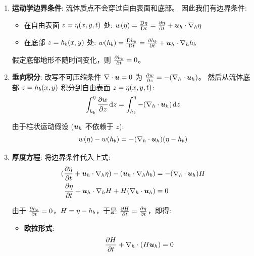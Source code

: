 \begin{enumerate}
    \item \textbf{运动学边界条件}:
    流体质点不会穿过自由表面和底部。
    因此我们有边界条件:
    \begin{itemize}
        \item 在自由表面 $z = \eta(x, y, t)$ 处: $w(\freeheight) = \matderiv{\freeheight} = \pde{\freeheight}{\timevar} + \vel_h \cdot \nabla_h \freeheight$
        \item 在底部 $z = h_b(x, y)$ 处: $w(\bottomheight) = \matderiv{\bottomheight} = \pde{\bottomheight}{\timevar} + \vel_h \cdot \nabla_h \bottomheight$
    \end{itemize}

    假定底部地形不随时间变化，则 $\pde{\bottomheight}{\timevar} = 0$。

    \item \textbf{垂向积分}:
    改写不可压缩条件 $\nabla \cdot \bm{u} = 0$ 为 $\pde{w}{z} = -(\nabla_h \cdot \vel_h)$。
    然后从流体底部 $z = h_b(x, y)$ 积分到自由表面 $z = \eta(x, y, t)$:
    \begin{equation*}
        \int_{\bottomheight}^\freeheight \pde{w}{z} \dd{z} = \int_{\bottomheight}^\freeheight -(\nabla_h \cdot \vel_h) \dd{z}
    \end{equation*}

    由于柱状运动假设 ($\bm{u}_h$ 不依赖于 $z$):
    \begin{equation*}
        w(\eta) - w(h_b) = -(\nabla_h \cdot \bm{u}_h) (\eta - h_b)
    \end{equation*}

    \item \textbf{厚度方程}:
    将边界条件代入上式:
    \begin{align*}
        (\pde{\freeheight}{\timevar} + \vel_h \cdot \nabla_h \freeheight) - (\vel_h \cdot \nabla_h \bottomheight) &= -(\nabla_h \cdot \vel_h) \depth \\
        \pde{\freeheight}{\timevar} + \vel_h \cdot \nabla_h \depth + \depth(\nabla_h \cdot \vel_h) &= 0
    \end{align*}

    由于 $\pde{\bottomheight}{\timevar} = 0$，$H = \eta - h_b$，于是 $\pde{\depth}{\timevar} = \pde{\freeheight}{\timevar}$，即得:
    \begin{itemize}
        \item \textbf{欧拉形式}:
        \begin{equation}
            \pde{\depth}{\timevar} + \nabla_h \cdot (\depth \vel_h) = 0
            \label{eq:thickness_eulerian}
        \end{equation}


\end{itemize}
\end{enumerate}
